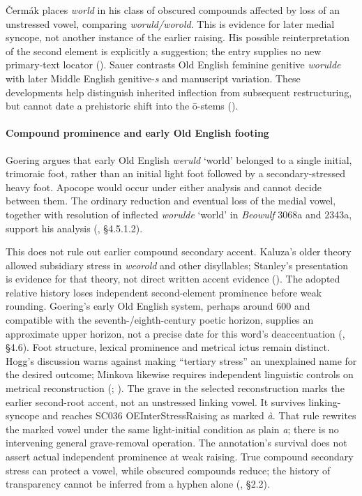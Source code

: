 \documentclass[
  british,
  a4paper,
]{article}
\begin{document}
Čermák places \emph{world} in his class of obscured compounds affected
by loss of an unstressed vowel, comparing \emph{woruld/worold}. This is
evidence for later medial syncope, not another instance of the earlier
raising. His possible reinterpretation of the second element is
explicitly a suggestion; the entry supplies no new primary-text locator
(). Sauer contrasts Old
English feminine genitive \emph{worulde} with later Middle English
genitive-\emph{s} and manuscript variation. These developments help
distinguish inherited inflection from subsequent restructuring, but
cannot date a prehistoric shift into the ō-stems
().

\paragraph{Compound prominence and early Old English
footing}\label{compound-prominence-and-early-old-english-footing}

Goering argues that early Old English \emph{weruld} `world' belonged to
a single initial, trimoraic foot, rather than an initial light foot
followed by a secondary-stressed heavy foot. Apocope would occur under
either analysis and cannot decide between them. The ordinary reduction
and eventual loss of the medial vowel, together with resolution of
inflected \emph{worulde} `world' in \emph{Beowulf} 3068a and 2343a,
support his analysis (,
§4.5.1.2).

This does not rule out earlier compound secondary accent. Kaluza's older
theory allowed subsidiary stress in \emph{weorold} and other
disyllables; Stanley's presentation is evidence for that theory, not
direct written accent evidence (). The adopted relative history loses independent second-element
prominence before weak rounding. Goering's early Old English system,
perhaps around 600 and compatible with the seventh-/eighth-century
poetic horizon, supplies an approximate upper horizon, not a precise
date for this word's deaccentuation (, §4.6). Foot structure, lexical prominence and metrical
ictus remain distinct. Hogg's discussion warns against making ``tertiary
stress'' an unexplained name for the desired outcome; Minkova likewise
requires independent linguistic controls on metrical reconstruction
(;
). The grave in the
selected reconstruction marks the earlier second-root accent, not an
unstressed linking vowel. It survives linking-syncope and reaches SC036
OEInterStressRaising as marked \emph{à}. That rule rewrites the marked
vowel under the same light-initial condition as plain \emph{a}; there is
no intervening general grave-removal operation. The annotation's
survival does not assert actual independent prominence at weak raising.
True compound secondary stress can protect a vowel, while obscured
compounds reduce; the history of transparency cannot be inferred from a
hyphen alone (, §2.2).
\end{document}
